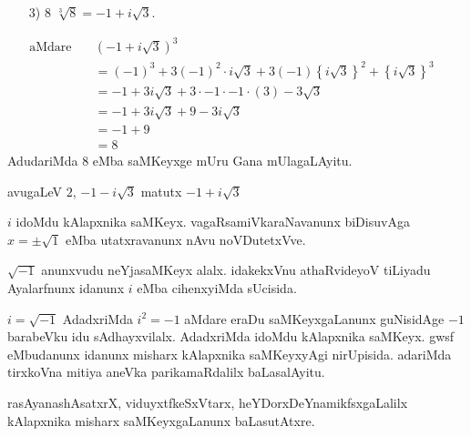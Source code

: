 \begin{itemize}
\item[{\rm 3)}] $8$  $\sqrt[3]{8} = -1 +i\sqrt{3}$.
\end{itemize}
\begin{align*}
\text{aMdare}\quad &(-1+i\sqrt{3})^3&\\
&= (-1)^3 + 3(-1)^2\cdot i\sqrt{3}+3(-1)\left\{i\sqrt{3}\right\}^2 + \left\{i\sqrt{3}\right\}^3\\
&= -1 + 3i\sqrt{3} +3\cdot -1\cdot -1 \cdot (3) - 3\sqrt{3}\\
&= -1+3i\sqrt{3}+9 -3i\sqrt{3}\\
&= -1+9\\
&= 8
\end{align*}
AdudariMda $8$ eMba saMKeyxge mUru Gana mUlagaLAyitu.

avugaLeV $2$, $-1-i\sqrt{3}$ \;matutx\; $-1+i\sqrt{3}$ 

$i$ idoMdu kAlapxnika saMKeyx. vagaRsamiVkaraNavanunx biDisuvAga $x =\pm \sqrt{1}$ eMba utatxravanunx nAvu noVDutetxVve.

$\sqrt{-1}$ anunxvudu neYjasaMKeyx alalx. idakekxVnu athaRvideyoV tiLiyadu Ayalarfnunx idanunx $i$ eMba cihenxyiMda sUcisida.

$i=\sqrt{-1}$ AdadxriMda $i^2=-1$ aMdare eraDu saMKeyxgaLanunx guNisidAge $-1$ barabeVku idu sAdhayxvilalx. AdadxriMda idoMdu kAlapxnika saMKeyx. gwsf eMbudanunx idanunx misharx kAlapxnika saMKeyxyAgi nirUpisida. adariMda tirxkoVna mitiya aneVka parikamaRdalilx baLasalAyitu.

rasAyanashAsatxrX, viduyxtfkeSxVtarx, heYDorxDeYnamikfsxgaLalilx kAlapxnika misharx saMKeyx\-gaLanunx baLasutAtxre.
